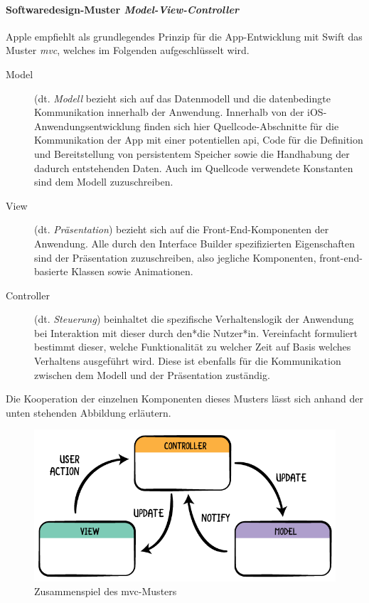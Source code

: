 \paragraph{Softwaredesign-Muster \textit{Model-View-Controller}} Apple empfiehlt als grundlegendes Prinzip für die App-Entwicklung mit Swift das Muster \textit{\ac{mvc}}, welches im Folgenden aufgeschlüsselt wird.

\begin{description}
	\item[Model] (dt. \textit{Modell} bezieht sich auf das Datenmodell und die datenbedingte Kommunikation innerhalb der Anwendung. Innerhalb von der iOS-Anwendungsentwicklung finden sich hier Quellcode-Abschnitte für die Kommunikation der App mit einer potentiellen \acs{api}, Code für die Definition und Bereitstellung von persistentem Speicher sowie die Handhabung der dadurch entstehenden Daten. Auch im Quellcode verwendete Konstanten sind dem Modell zuzuschreiben.
	\item[View] (dt. \textit{Präsentation}) bezieht sich auf die Front-End-Komponenten der Anwendung. Alle durch den Interface Builder spezifizierten Eigenschaften sind der Präsentation zuzuschreiben, also jegliche Komponenten, front-end-basierte Klassen sowie Animationen.
	\item[Controller] (dt. \textit{Steuerung}) beinhaltet die spezifische Verhaltenslogik der Anwendung bei Interaktion mit dieser durch den*die Nutzer*in. Vereinfacht formuliert bestimmt dieser, welche Funktionalität zu welcher Zeit auf Basis welches Verhaltens ausgeführt wird. Diese ist ebenfalls für die Kommunikation zwischen dem Modell und der Präsentation zuständig.
\end{description}

Die Kooperation der einzelnen Komponenten dieses Musters lässt sich anhand der unten stehenden Abbildung erläutern.

\begin{figure}[h!]
	\centering
	\includegraphics[width=0.5\linewidth]{img/mvc}
	\caption{Zusammenspiel des \ac{mvc}-Musters}
\end{figure}


